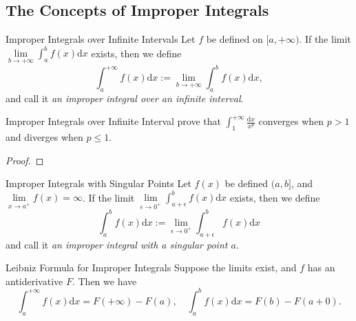 \subsection{The Concepts of Improper Integrals}

\begin{definition}{Improper Integrals over Infinite Intervals}{}
  Let $f$ be defined on $[a, +\infty)$.
  If the limit $\lim \limits _{b \rightarrow +\infty} \int_a^b f(x)\mathrm{d} x$
  exists,
  then we define
  \begin{equation}
    \int_a^{+\infty} f(x) \mathrm{d} x := \lim \limits _{b \rightarrow +\infty} \int_a^b f(x)\mathrm{d} x,
  \end{equation}
  and call it \emph{an improper integral over an infinite interval}.
\end{definition}

\begin{example}{Improper Integrals over Infinite Interval}{}
  prove that $\int_1^{+\infty} \frac{\mathrm{d}x}{x^p}$ converges when $p > 1$
  and diverges when $p \leq 1$.
\end{example}

\begin{proof}
  
\end{proof}

\begin{definition}{Improper Integrals with Singular Points}{}
  Let $f(x)$ be defined $(a, b]$,
  and $\lim \limits _{x \rightarrow a^+}f(x) = \infty$.
  If the limit $\lim \limits _{\epsilon \rightarrow 0^+} \int_{a+\epsilon}^b
  f(x) \mathrm{d} x$ exists,
  then we define
  \begin{equation}
    \int_a^b f(x) \mathrm{d} x := \lim \limits _{\epsilon \rightarrow 0^+} \int_{a+\epsilon}^b
  f(x) \mathrm{d} x
  \end{equation}
  and call it \emph{an improper integral with a singular point $a$}.
\end{definition}

\begin{theorem}{Leibniz Formula for Improper Integrals}{}
  Suppose the limits exist, and $f$ has an antiderivative $F$.
  Then we have
  \begin{equation}
    \int_a^{+\infty} f(x) \mathrm{d} x = F(+\infty) - F(a), \quad
    \int_a^b f(x) \mathrm{d} x = F(b) - F(a+0).
  \end{equation}
\end{theorem}

